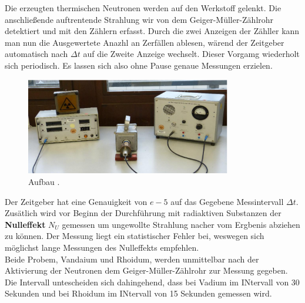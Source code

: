 Die erzeugten thermischen Neutronen %
werden auf den Werkstoff gelenkt. Die anschließende auftrentende Strahlung wir von  dem Geiger-Müller-Zählrohr detektiert und mit den Zählern erfasst.
Durch die zwei Anzeigen der Zähller kann man nun die Ausgewertete Anazhl an Zerfällen ablesen, wärend der Zeitgeber automatisch nach $\Delta t$ auf die Zweite Anzeige wechselt.
Dieser Vorgamg wiederholt sich periodisch. Es lassen sich also ohne Pause genaue Messungen erzielen.

\begin{figure}
  \centering
  \includegraphics[width=0.8\textwidth]{bilder/Screenshot 2021-01-22 103203.png}
  \caption{Aufbau  \cite{hinweis}.}
  \label{fig:aufbau}
\end{figure}

Der Zeitgeber hat eine Genauigkeit von $\si{e-5}$ auf das Gegebene Messintervall $\Delta t$.
Zusätlich wird vor Beginn der Durchführung mit radiaktiven Substanzen der \textbf{Nulleffekt} $N_U$ %
gemessen um ungewollte Strahlung nacher vom Ergbenis abziehen zu können.  Der Messung liegt ein statistischer Fehler bei, weswegen sich möglichst lange Messungen des Nulleffekts empfehlen.
\\
\newline
Beide Probem, Vandaium und Rhoidum, werden unmittelbar nach der Aktivierung der Neutronen dem Geiger-Müller-Zählrohr zur Messung gegeben.
Die Intervall untescheiden sich dahingehend, dass bei Vadium im INtervall von 30 Sekunden und bei Rhoidum im INtervall von 15 Sekunden gemessen wird.


